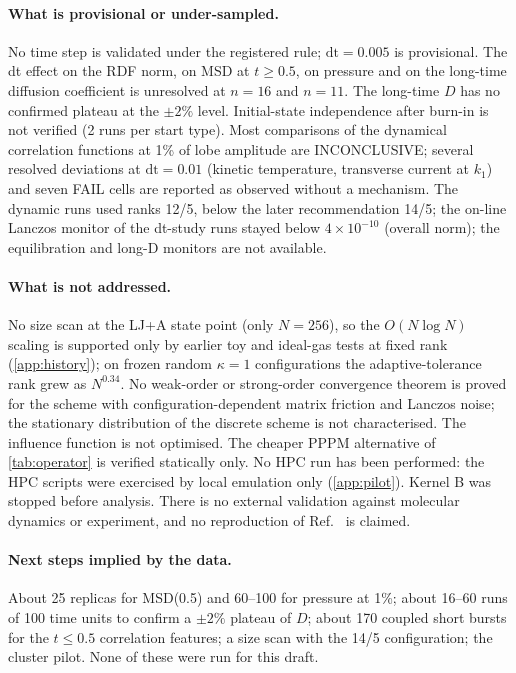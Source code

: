 \documentclass[11pt]{article}
\DeclareRobustCommand{\_}{\textunderscore\allowbreak}
\theoremstyle{remark}
\theoremstyle{definition}
\begin{document}
\paragraph{What is provisional or under-sampled.}
No time step is validated under the registered rule; $\mathrm{dt}=0.005$ is provisional. The dt effect on the RDF norm, on MSD
at $t\ge0.5$, on pressure and on the long-time diffusion coefficient is unresolved at $n=16$ and $n=11$. The long-time $D$ has no
confirmed plateau at the $\pm2\%$ level. Initial-state independence after burn-in is not verified (2 runs per start type). Most
comparisons of the dynamical correlation functions at 1\% of lobe amplitude are INCONCLUSIVE; several resolved deviations at
$\mathrm{dt}=0.01$ (kinetic temperature, transverse current at $k_1$) and seven FAIL cells are reported as observed without a
mechanism. The dynamic runs used ranks 12/5, below the later recommendation 14/5; the on-line Lanczos monitor of the dt-study runs stayed below
$4\times10^{-10}$ (overall norm); the equilibration and long-D monitors are not available.

\paragraph{What is not addressed.}
No size scan at the LJ+A state point (only $N=256$), so the $O(N\log N)$ scaling is supported only by earlier toy and ideal-gas
tests at fixed rank (\cref{app:history}); on frozen random $\kappa=1$ configurations the adaptive-tolerance rank grew as $N^{0.34}$. No weak-order or strong-order
convergence theorem is proved for the scheme with configuration-dependent matrix friction and Lanczos noise; the stationary
distribution of the discrete scheme is not characterised. The influence function is not optimised. The cheaper PPPM alternative
of \cref{tab:operator} is verified statically only. No HPC run has been performed: the HPC scripts were exercised by local
emulation only (\cref{app:pilot}). Kernel B was stopped before analysis. There is no external validation against molecular dynamics
or experiment, and no reproduction of Ref.~\cite{LyuLei2023} is claimed.

\paragraph{Next steps implied by the data.}
About 25 replicas for MSD(0.5) and 60--100 for pressure at 1\%; about 16--60 runs of 100 time units to confirm a $\pm2\%$ plateau of
$D$; about 170 coupled short bursts for the $t\le0.5$ correlation features; a size scan with the 14/5 configuration; the cluster
pilot. None of these were run for this draft.
\end{document}
